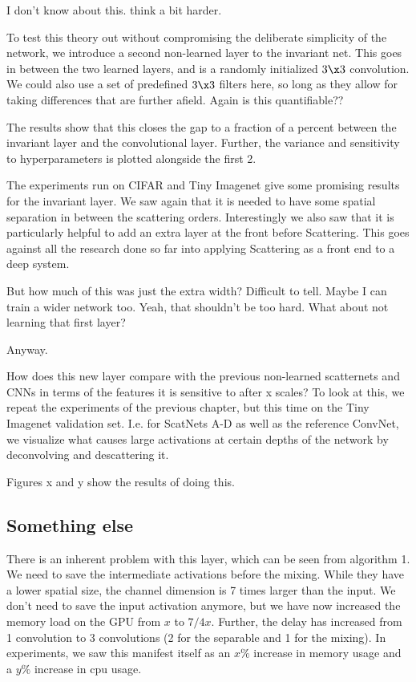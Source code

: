 I don't know about this. think a bit harder.

To test this theory out without compromising the deliberate simplicity of the
network, we introduce a second non-learned layer to the invariant net. This goes
in between the two learned layers, and is a randomly initialized $3\x 3$
convolution. We could also use a set of predefined $3\x 3$ filters here, so long
as they allow for taking differences that are further afield. Again is this
quantifiable??

The results show that this closes the gap to a fraction of a percent between the
invariant layer and the convolutional layer. Further, the variance and
sensitivity to hyperparameters is plotted alongside the first 2.


The experiments run on CIFAR and Tiny Imagenet give some promising results for
the invariant layer. We saw again that it is needed to have some spatial
separation in between the scattering orders. Interestingly we also saw that it
is particularly helpful to add an extra layer at the front before Scattering.
This goes against all the research done so far into applying Scattering as a
front end to a deep system. 

But how much of this was just the extra width?
Difficult to tell. Maybe I can train a wider network too. Yeah, that shouldn't
be too hard. What about not learning that first layer?


Anyway.

How does this new layer compare with the previous non-learned scatternets and
CNNs in terms of the features it is sensitive to after x scales? To look at
this, we repeat the experiments of the previous chapter, but this time on the
Tiny Imagenet validation set. I.e. for ScatNets A-D as well as the reference
ConvNet, we visualize what causes large activations at certain depths of the network 
by deconvolving and descattering it.

Figures x and y show the results of doing this.

\subsection{Something else}
There is an inherent problem with this layer, which can be seen from algorithm
1. We need to save the intermediate activations before the mixing. While they
have a lower spatial size, the channel dimension is 7 times larger than the
input. We don't need to save the input activation anymore, but we have now
increased the memory load on the GPU from $x$ to $7/4 x$. Further, the delay has
increased from 1 convolution to 3 convolutions (2 for the separable \DTCWT and 1
for the mixing). In experiments, we saw this manifest itself as an $x\%$
increase in memory usage and a $y\%$ increase in cpu usage.

